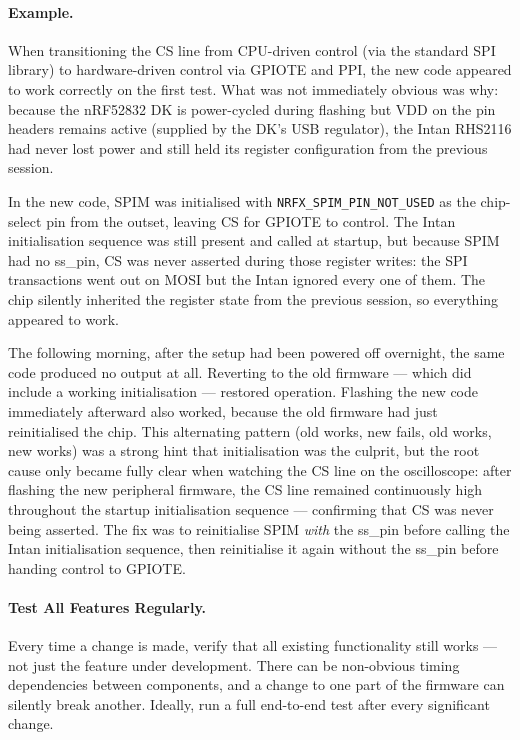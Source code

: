 \paragraph{Example.}
When transitioning the CS line from CPU-driven control (via the standard SPI
library) to hardware-driven control via GPIOTE and PPI, the new code appeared to
work correctly on the first test. What was not immediately obvious was why: because
the nRF52832 DK is power-cycled during flashing but VDD on the pin headers remains
active (supplied by the DK's USB regulator), the Intan RHS2116 had never lost
power and still held its register configuration from the previous session.

In the new code, SPIM was initialised with \texttt{NRFX\_SPIM\_PIN\_NOT\_USED}
as the chip-select pin from the outset, leaving CS for GPIOTE to control.
The Intan initialisation sequence was still present and called at startup, but
because SPIM had no ss\_pin, CS was never asserted during those register writes:
the SPI transactions went out on MOSI but the Intan ignored every one of them.
The chip silently inherited the register state from the previous session, so
everything appeared to work.

The following morning, after the setup had been powered off overnight, the same
code produced no output at all. Reverting to the old firmware --- which did include
a working initialisation --- restored operation. Flashing the new code immediately
afterward also worked, because the old firmware had just reinitialised the chip.
This alternating pattern (old works, new fails, old works, new works) was a strong
hint that initialisation was the culprit, but the root cause only became fully clear
when watching the CS line on the oscilloscope: after flashing the new peripheral
firmware, the CS line remained continuously high throughout the startup
initialisation sequence --- confirming that CS was never being asserted.
The fix was to reinitialise SPIM \emph{with} the ss\_pin before calling the Intan
initialisation sequence, then reinitialise it again without the ss\_pin before
handing control to GPIOTE.

\paragraph{Test All Features Regularly.}
Every time a change is made, verify that all existing functionality still works ---
not just the feature under development. There can be non-obvious timing dependencies
between components, and a change to one part of the firmware can silently break
another. Ideally, run a full end-to-end test after every significant change.

